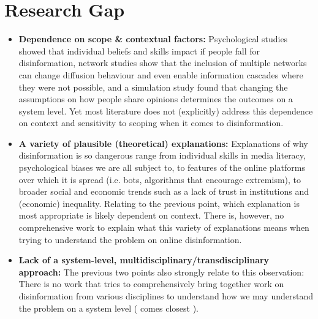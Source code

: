 \section{Research Gap}

\begin{itemize}
	\item \textbf{Dependence on scope \& contextual factors:} Psychological studies showed that individual beliefs and skills impact if people fall for disinformation, network studies show that the inclusion of multiple networks can change diffusion behaviour and even enable information cascades where they were not possible, and a simulation study found that changing the assumptions on how people share opinions determines the outcomes on a system level. Yet most literature does not (explicitly) address this dependence on context and sensitivity to scoping when it comes to disinformation. 
	\item \textbf{A variety of plausible (theoretical) explanations:} Explanations of why disinformation is so dangerous range from individual skills in media literacy, psychological biases we are all subject to, to features of the online platforms over which it is spread (i.e. bots, algorithms that encourage extremism), to broader social and economic trends such as a lack of trust in institutions and (economic) inequality. Relating to the previous point, which explanation is most appropriate is likely dependent on context. There is, however, no comprehensive work to explain what this variety of explanations means when trying to understand the problem on online disinformation.
	\item \textbf{Lack of a system-level, multidisciplinary/transdisciplinary approach:} The previous two points also strongly relate to this observation: There is no work that tries to comprehensively bring together work on disinformation from various disciplines to understand how we may understand the problem on a system level (\cite{lewandowsky2017beyond} comes closest ).
\end{itemize}

